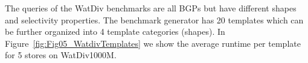 
%

%
%
%
The queries of the WatDiv benchmarks are all BGPs but have different shapes and selectivity properties. The benchmark generator has 20 templates which can be further organized into 4 template categories (shapes). 
In Figure~\ref{fig:Fig05_WatdivTemplates} we show the average runtime per template for 5 stores on WatDiv1000M.
